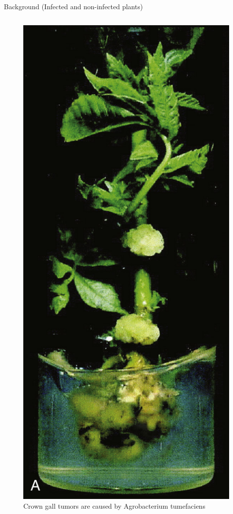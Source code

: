 \documentclass[
  ignorenonframetext,
  aspectratio=169]{beamer}
\begin{document}
\begin{frame}{Background (Infected and non-infected plants)}
\protect\hypertarget{background-infected-and-non-infected-plants}{}
\begin{columns}[T,onlytextwidth]

\begin{figure}
\includegraphics[width=0.4\linewidth]{../images/agrobacterium_gall_a} \caption{Crown gall tumors are caused by Agrobacterium tumefaciens}\label{fig:agrobacterium-gall1}
\end{figure}



\end{columns}
\end{frame}
\end{document}
